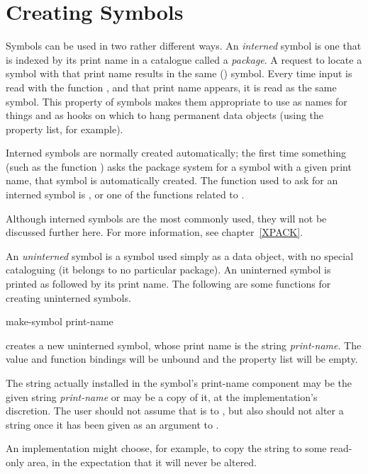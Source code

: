 \section{Creating Symbols}

Symbols can be used in two rather different ways.
An \emph{interned} symbol is one that is indexed by its print name
in a catalogue called a \emph{package}.
A request to locate a symbol with that print name results
in the same () symbol.  Every time input is read with the
function ,
and that print name appears, it is read as the same symbol.
This property of symbols makes them appropriate to use as names for
things and as hooks on which to hang permanent data objects
(using the property list, for example).

Interned symbols are normally created automatically; the first time
something (such as the function )
asks the package system for a symbol with a given print name,
that symbol is automatically created.  The function used to ask for
an interned symbol is , or one of the functions
related to .

Although interned symbols are the most commonly
used, they will not be discussed further here.  For more information,
see chapter~\ref{XPACK}.

An \emph{uninterned} symbol is a symbol used simply as a data object,
with no special cataloguing (it belongs to no particular package).
An uninterned symbol is printed as \cd{\#:} followed by its
print name.
The following are some functions for creating uninterned symbols.

\begin{defun}[Function]
make-symbol print-name

 creates a new uninterned symbol, whose
print name is the string \emph{print-name}.  The value and function bindings will
be unbound and the property list will be empty.

The string actually installed in the symbol's print-name component
may be the given string \emph{print-name} or may be a copy of it,
at the implementation's discretion.  The user should not assume
that  is  to , but also
should not alter a string once it has been given as an argument
to .

\beforenoterule
\begin{implementation}
An implementation might choose, for example,
to copy the string to some read-only area, in the expectation that
it will never be altered.
\end{implementation}
\afternoterule
\end{defun}

